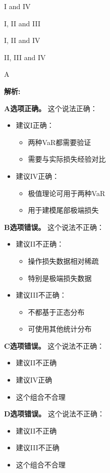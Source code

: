 \documentclass{article}
\newenvironment{explanation}
{\textbf{解析:}\par}
{\par}
\begin{document}
\begin{choices}
    \item I and IV
    \item I, II and III
    \item I, II and IV
    \item II, III and IV
\end{choices}

\begin{correctanswer}
    A
\end{correctanswer}

\begin{explanation}
    \textbf{A选项正确。}
    这个说法正确：
    \begin{itemize}
        \item 建议I正确：
        \begin{itemize}
            \item 两种VaR都需要验证
            \item 需要与实际损失经验对比
        \end{itemize}
        \item 建议IV正确：
        \begin{itemize}
            \item 极值理论可用于两种VaR
            \item 用于建模尾部极端损失
        \end{itemize}
    \end{itemize}

    \textbf{B选项错误。}
    这个说法不正确：
    \begin{itemize}
        \item 建议II不正确：
        \begin{itemize}
            \item 操作损失数据相对稀疏
            \item 特别是极端损失数据
        \end{itemize}
        \item 建议III不正确：
        \begin{itemize}
            \item 不都基于正态分布
            \item 可使用其他统计分布
        \end{itemize}
    \end{itemize}

    \textbf{C选项错误。}
    这个说法不正确：
    \begin{itemize}
        \item 建议II不正确
        \item 建议IV正确
        \item 这个组合不合理
    \end{itemize}

    \textbf{D选项错误。}
    这个说法不正确：
    \begin{itemize}
        \item 建议II不正确
        \item 建议III不正确
        \item 这个组合不合理
    \end{itemize}
\end{explanation}
\end{document}
